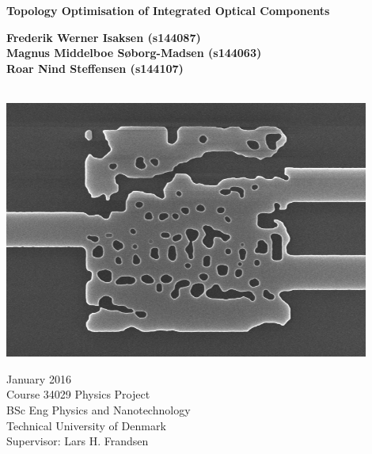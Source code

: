 \begin{titlepage}
    \begin{center}
        \vspace*{1cm}
        
        \Huge
        \hline
        \vspace{0.5cm}
        \textbf{Topology Optimisation of Integrated Optical Components}
        \vspace{0.5cm}
        \hline
 
        \vspace{2cm}
        \Large
        \textbf{Frederik Werner Isaksen (s144087) \\
                Magnus Middelboe Søborg-Madsen (s144063) \\
                Roar Nind Steffensen (s144107)} \\
                \\
        \vfill

        \includegraphics[width=12cm]{fig/Kasse40nm.png}
        
        \vspace{0.8cm}
        \Large
        January 2016\\
        Course 34029 Physics Project\\
        BSc Eng Physics and Nanotechnology\\
        Technical University of Denmark\\
        Supervisor: Lars H. Frandsen\\
        \vspace*{0.8cm}
    \end{center}
\end{titlepage}


